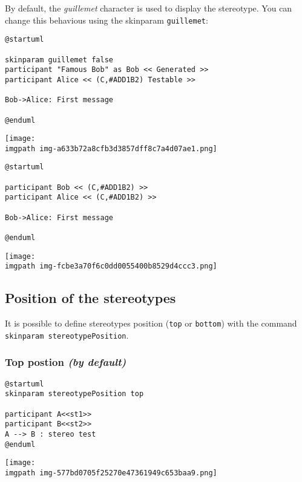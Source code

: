 By default, the \textit{guillemet} character is used to display the stereotype.
You can change this behavious using the skinparam \texttt{guillemet}:


\begin{verbatim}
@startuml

skinparam guillemet false
participant "Famous Bob" as Bob << Generated >>
participant Alice << (C,#ADD1B2) Testable >>

Bob->Alice: First message

@enduml
\end{verbatim}
\begin{center}
\texttt{[image: \\imgpath img-a633b72a8cfb3d3857dff8c7a4d07ae1.png]}
\end{center}


\begin{verbatim}
@startuml

participant Bob << (C,#ADD1B2) >>
participant Alice << (C,#ADD1B2) >>

Bob->Alice: First message

@enduml
\end{verbatim}
\begin{center}
\texttt{[image: \\imgpath img-fcbe3a70f6c0dd0055400b8529d4ccc3.png]}
\end{center}


%
%
\subsection{Position of the stereotypes}


It is possible to define stereotypes position (\texttt{top} or \texttt{bottom}) with the command \texttt{skinparam stereotypePosition}.


\subsubsection{Top postion \textit{(by default)}}
\begin{verbatim}
@startuml
skinparam stereotypePosition top

participant A<<st1>>
participant B<<st2>>
A --> B : stereo test
@enduml
\end{verbatim}
\begin{center}
\texttt{[image: \\imgpath img-577bd0705f25270e47361949c653baa9.png]}
\end{center}



